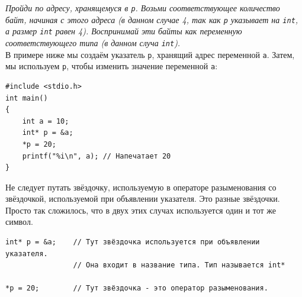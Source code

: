 \documentclass[10pt]{article}
\begin{document}
\textit{Пройди по адресу, хранящемуся в \texttt{p}. Возьми соответствующее количество байт, начиная с этого адреса (в данном случае 4, так как \texttt{p} указывает на \texttt{int}, а размер \texttt{int} равен 4). Воспринимай эти байты как переменную соответствующего типа (в данном случа \texttt{int}).}\\

\noindent В примере ниже мы создаём указатель \texttt{p}, хранящий адрес переменной \texttt{a}. Затем, мы используем \texttt{p}, чтобы изменить значение переменной \texttt{a}:
\begin{lstlisting}
#include <stdio.h>
int main() 
{
    int a = 10;
    int* p = &a;
    *p = 20;
    printf("%i\n", a); // Напечатает 20
}
\end{lstlisting}
Не следует путать звёздочку, используемую в операторе разыменования со звёздочкой, используемой при объявлении указателя. 
Это разные звёздочки. Просто так сложилось, что в двух этих случах используется один и тот же символ.
\begin{lstlisting}
int* p = &a;    // Тут звёздочка используется при объявлении указателя. 
                // Она входит в название типа. Тип называется int*

*p = 20;        // Тут звёздочка - это оператор разыменования.
\end{lstlisting}

\newpage
\end{document}
